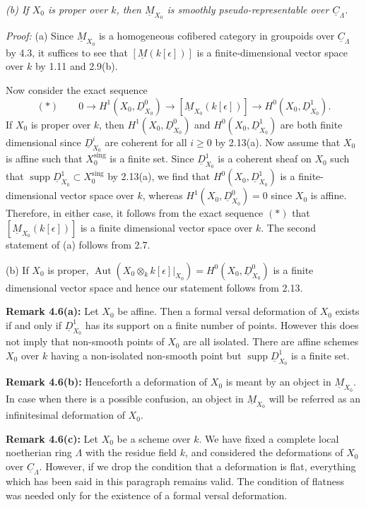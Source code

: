 \documentclass[11pt]{article}
\theoremstyle{plain}
\theoremstyle{definition}
\theoremstyle{remark}
\DeclareMathOperator{\Aut}{Aut}
\DeclareMathOperator{\supp}{supp}
\begin{document}
\textit{(b) If $X_0$ is proper over $k$, then $\underline{M}_{X_0}$ is smoothly pseudo-representable over $\underline{C}_\Lambda$.}

\medskip
\noindent\textit{Proof:} (a) Since $\underline{M}_{X_0}$ is a homogeneous cofibered category in groupoids over $\underline{C}_\Lambda$ by 4.3, it suffices to see that $[\underline{M}(k[\epsilon])]$ is a finite-dimensional vector space over $k$ by 1.11 and 2.9(b).

Now consider the exact sequence
\[(*) \qquad 0 \to H^1(X_0, \underline{D}_{X_0}^0) \to [\underline{M}_{X_0}(k[\epsilon])] \to H^0(X_0, \underline{D}_{X_0}^1).\]
If $X_0$ is proper over $k$, then $H^1(X_0, \underline{D}_{X_0}^0)$ and $H^0(X_0, \underline{D}_{X_0}^1)$ are both finite dimensional since $\underline{D}_{X_0}^i$ are coherent for all $i \geq 0$ by 2.13(a). Now assume that $X_0$ is affine such that $X_0^{\mathrm{sing}}$ is a finite set. Since $\underline{D}_{X_0}^1$ is a coherent sheaf on $X_0$ such that $\supp \underline{D}_{X_0}^1 \subset X_0^{\mathrm{sing}}$ by 2.13(a), we find that $H^0(X_0, \underline{D}_{X_0}^1)$ is a finite-dimensional vector space over $k$, whereas $H^1(X_0, \underline{D}_{X_0}^0) = 0$ since $X_0$ is affine. Therefore, in either case, it follows from the exact sequence $(*)$ that $[\underline{M}_{X_0}(k[\epsilon])]$ is a finite dimensional vector space over $k$. The second statement of (a) follows from 2.7.

(b) If $X_0$ is proper, $\Aut(X_0 \otimes_k k[\epsilon]|_{X_0}) = H^0(X_0, \underline{D}_{X_0}^0)$ is a finite dimensional vector space and hence our statement follows from 2.13.

\medskip
\noindent\textbf{Remark 4.6(a):} Let $X_0$ be affine. Then a formal versal deformation of $X_0$ exists if and only if $\underline{D}_{X_0}^1$ has its support on a finite number of points. However this does not imply that non-smooth points of $X_0$ are all isolated. There are affine schemes $X_0$ over $k$ having a non-isolated non-smooth point but $\supp \underline{D}_{X_0}^1$ is a finite set.

\medskip
\noindent\textbf{Remark 4.6(b):} Henceforth a deformation of $X_0$ is meant by an object in $\underline{M}_{X_0}$. In case when there is a possible confusion, an object in $\underline{M}_{X_0}$ will be referred as an infinitesimal deformation of $X_0$.

\medskip
\noindent\textbf{Remark 4.6(c):} Let $X_0$ be a scheme over $k$. We have fixed a complete local noetherian ring $\Lambda$ with the residue field $k$, and considered the deformations of $X_0$ over $\underline{C}_\Lambda$. However, if we drop the condition that a deformation is flat, everything which has been said in this paragraph remains valid. The condition of flatness was needed only for the existence of a formal versal deformation.
\end{document}
